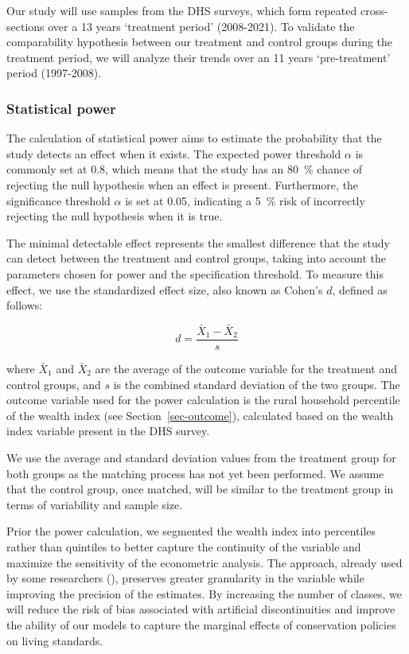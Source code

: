 \documentclass[
]{article}
\begin{document}
Our study will use samples from the DHS surveys, which form repeated
cross-sections over a 13 years `treatment period' (2008-2021). To
validate the comparability hypothesis between our treatment and control
groups during the treatment period, we will analyze their trends over an
11 years `pre-treatment' period (1997-2008).

\subsubsection{Statistical power}\label{statistical-power}

The calculation of statistical power aims to estimate the probability
that the study detects an effect when it exists. The expected power
threshold \(\alpha\) is commonly set at 0.8, which means that the study
has an 80~\% chance of rejecting the null hypothesis when an effect is
present. Furthermore, the significance threshold \(\alpha\) is set at
0.05, indicating a 5~\% risk of incorrectly rejecting the null
hypothesis when it is true.

The minimal detectable effect represents the smallest difference that
the study can detect between the treatment and control groups, taking
into account the parameters chosen for power and the specification
threshold. To measure this effect, we use the standardized effect size,
also known as Cohen's \(d\), defined as follows:

\[
d = \frac{\bar{X}_1 - \bar{X}_2}{s}\]

where \(\bar{X}_1\) and \(\bar{X}_2\) are the average of the outcome
variable for the treatment and control groups, and \(s\) is the combined
standard deviation of the two groups. The outcome variable used for the
power calculation is the rural household percentile of the wealth index
(see Section~\ref{sec-outcome}), calculated based on the wealth index
variable present in the DHS survey.

We use the average and standard deviation values from the treatment
group for both groups as the matching process has not yet been
performed. We assume that the control group, once matched, will be
similar to the treatment group in terms of variability and sample size.

Prior the power calculation, we segmented the wealth index into
percentiles rather than quintiles to better capture the continuity of
the variable and maximize the sensitivity of the econometric analysis.
The approach, already used by some researchers
(), preserves greater granularity in the variable while improving
the precision of the estimates. By increasing the number of classes, we
will reduce the risk of bias associated with artificial discontinuities
and improve the ability of our models to capture the marginal effects of
conservation policies on living standards.
\end{document}
